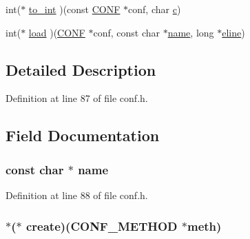 \begin{DoxyCompactItemize}
int($\ast$ \hyperlink{structconf__method__st_ad5d0e6e58fc09b50735c96f2eb6503b2}{to\+\_\+int} )(const \hyperlink{crypto_2ossl__typ_8h_a22bfdc2f19c31f1ec7bd6d807aeb68d2}{C\+O\+NF} $\ast$conf, char \hyperlink{ssl__locl_8h_a0f1453a6148b10d986345d1db98a4d6f}{c})
\item 
int($\ast$ \hyperlink{structconf__method__st_ae324bba0fcae31924c74004af2603ea9}{load} )(\hyperlink{crypto_2ossl__typ_8h_a22bfdc2f19c31f1ec7bd6d807aeb68d2}{C\+O\+NF} $\ast$conf, const char $\ast$\hyperlink{structconf__method__st_afcd1706c9144e6d6eee6127661ae3be2}{name}, long $\ast$\hyperlink{include_2openssl_2conf_8h_aff307de415418f7f6d79b819a7fe3f4d}{eline})
\end{DoxyCompactItemize}


\subsection{Detailed Description}


Definition at line 87 of file conf.\+h.



\subsection{Field Documentation}
\subsubsection[{\texorpdfstring{name}{name}}]{\setlength{\rightskip}{0pt plus 5cm}const char $\ast$ name}\hypertarget{structconf__method__st_afcd1706c9144e6d6eee6127661ae3be2}{}\label{structconf__method__st_afcd1706c9144e6d6eee6127661ae3be2}


Definition at line 88 of file conf.\+h.

\subsubsection[{\texorpdfstring{create}{create}}]{ $\ast$($\ast$ create)({\bf C\+O\+N\+F\+\_\+\+M\+E\+T\+H\+OD} $\ast$meth)}\hypertarget{structconf__method__st_a5b75aba720dbe63825206c993d97607d}{}\label{structconf__method__st_a5b75aba720dbe63825206c993d97607d}


